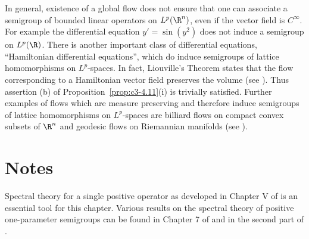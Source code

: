 In general, existence of a global flow does not ensure that one can
associate a semigroup of bounded linear operators on $L^p(\R ^n)$, even if
the vector field is $C^{\infty}$. For example the differential equation
$y' = \sin(y^2)$ does not induce a semigroup on $L^p(\R )$.
There is another important class of differential equations, \enquote{Hamiltonian differential equations}, which do induce semigroups of lattice homomorphisms on $L^p$-spaces. In fact, Liouville's Theorem states that the 
%
%
%
flow corresponding to a Hamiltonian vector field preserves the volume (see \citet[Section~3.3]{abrahammarsden:1978}). Thus assertion (b) of Proposition~\ref{prop:c3-4.11}(i) is trivially satisfied.
Further examples of flows which are measure preserving and therefore induce semigroups of lattice homomorphisms on $L^p$-spaces are billiard flows on compact convex subsets of $\R ^n$ and geodesic flows on Riemannian manifolds (see \citet{cornfeldfominsinai:1982}).



\clearpage
\section*{Notes}

Spectral theory for a single positive operator as developed in Chapter V of \citet{schaefer:1974} is an essential tool for this chapter. 
Various results on the spectral theory of positive one-parameter semigroups can be found in Chapter 7 of \citet{davies:1980} and in the second part of \citet{battyrobinson:1984}.

